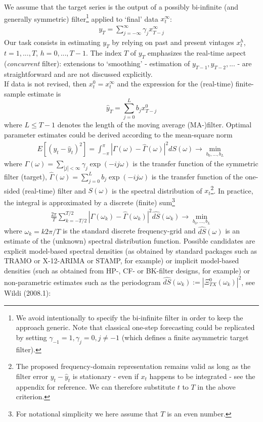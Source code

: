 \documentclass[11pt]{article}
\begin{document}
We assume that the target series is the output of a possibly bi-infinite (and generally symmetric) filter\footnote{We avoid intentionally to specify the bi-infinite filter in order to keep the approach generic. Note that classical one-step forecasting could be replicated by setting $\gamma_{-1}=1, \gamma_{j}=0, j\not= -1$ (which defines a finite asymmetric target filter).} applied to `final' data $x_t^\infty$:
\begin{eqnarray}\label{target}
y_T=\sum_{j=-\infty}^\infty \gamma_{j}x_{T-j}^{\infty}
\end{eqnarray}
Our task consists in estimating $y_T$ by relying on past and present vintages $x_t^h$, $t=1,...,T$, $h=0,...,T-1$. The index $T$ of $y_T$ emphasizes the real-time aspect (\emph{concurrent} filter): extensions to `smoothing' - estimation of $y_{T-1}, y_{T-2},...$ - are straightforward and are not discussed explicitly. \\
If data is not revised, then $x_t^0=x_t^\infty$ and the expression for the (real-time) finite-sample estimate is
\begin{equation}\label{osnr}
\hat{y}_T=\sum_{j=0}^Lb_jx_{T-j}^0
\end{equation}
where $L\leq T-1$ denotes the length of the moving average (MA-)filter. Optimal parameter estimates could be derived according to the mean-square norm
\begin{eqnarray*}
E[(y_t-\hat{y}_t)^2]=\int_{-\pi}^\pi|\Gamma(\omega)-\hat{\Gamma}(\omega)|^2 dS(\omega)\to \min_{b_0,...,b_L}
\end{eqnarray*}
where $\Gamma(\omega)=\sum_{|j|<\infty}\gamma_j\exp(-ij\omega)$ is the transfer function of the symmetric filter (target), $\hat{\Gamma}(\omega)=\sum_{j=0}^Lb_j\exp(-i j \omega)$ is the transfer function of the one-sided (real-time) filter and $S(\omega)$ is the spectral distribution of $x_t$\footnote{The proposed frequency-domain representation remains valid as long as the filter error $y_t-\hat{y}_t$ is stationary - even if $x_t$ happens to be integrated - see the appendix for reference. We can therefore substitute $t$ to $T$ in the above criterion.}. In practice, the integral is approximated by a discrete (finite) sum\footnote{For notational simplicity we here assume that $T$ is an even number.}
\begin{eqnarray}\label{psd}
\frac{2\pi}{T} \sum_{k=-T/2}^{T/2}
|\Gamma(\omega_k)-\hat{\Gamma}(\omega_k)|^2 \hat{dS}(\omega_k)\to \min_{b_0,...,b_L}
\end{eqnarray}
where $\omega_k=k2\pi/T$ is the standard discrete frequency-grid and $\hat{dS}(\omega)$ is an estimate of the (unknown) spectral distribution function. Possible candidates are explicit model-based spectral densities (as obtained by standard packages such as TRAMO or X-12-ARIMA or STAMP, for example) or implicit model-based densities (such as obtained from HP-, CF- or BK-filter designs, for example) or non-parametric estimates such as the periodogram $\hat{dS}(\omega_k):=\left|\Xi_{TX}^0(\omega_k)\right|^2$, see Wildi (2008.1):
\end{document}
